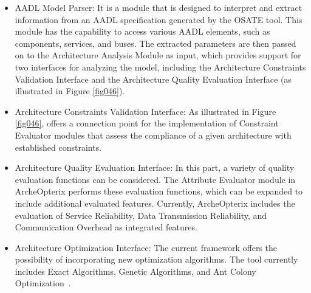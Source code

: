 \begin{itemize}
    \item AADL Model Parser: %
    It is a module that is designed to interpret and extract information from an AADL specification generated by the OSATE tool. This module has the capability to access various AADL elements, such as components, services, and buses. The extracted parameters are then passed on to the Architecture Analysis Module as input, which provides support for two interfaces for analyzing the model, including the Architecture Constraints Validation Interface and the Architecture Quality Evaluation Interface (as illustrated in Figure \ref{fig046}).




    \item Architecture Constraints Validation Interface: %
     As illustrated in Figure \ref{fig046}, offers a connection point for the implementation of Constraint Evaluator modules that assess the compliance of a given architecture with established constraints.




    \item Architecture Quality Evaluation Interface: %
    In this part, a variety of quality evaluation functions can be considered. The Attribute Evaluator module in ArcheOpterix performs these evaluation functions, which can be expanded to include additional evaluated features. Currently, ArcheOpterix includes the evaluation of Service Reliability, Data Transmission Reliability, and Communication Overhead as integrated features.




\item Architecture Optimization Interface: %
The current framework offers the possibility of incorporating new optimization algorithms. The tool currently includes Exact Algorithms, Genetic Algorithms, and Ant Colony Optimization~\cite{meedeniya2011reliability}.

\end{itemize}


